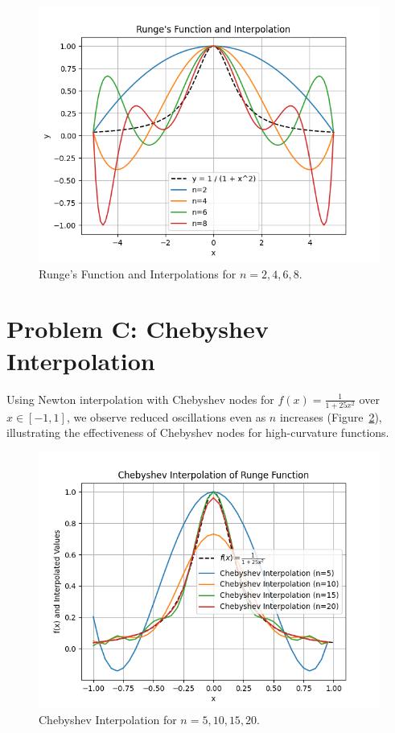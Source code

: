 \documentclass[a4paper]{article}
\begin{document}
\begin{figure}[H]
    \centering
    \includegraphics[scale=0.5]{B.png}
    \caption{Runge's Function and Interpolations for \( n = 2, 4, 6, 8 \).}
    \label{fig:runge}
\end{figure}

\section*{Problem C: Chebyshev Interpolation}
Using Newton interpolation with Chebyshev nodes for \( f(x) = \frac{1}{1 + 25x^2} \) over \( x \in [-1, 1] \), we observe reduced oscillations even as \( n \) increases (Figure~\ref{fig:chebyshev}), illustrating the effectiveness of Chebyshev nodes for high-curvature functions.

\begin{figure}[H]
    \centering
    \includegraphics[scale=0.5]{C.png}
    \caption{Chebyshev Interpolation for \( n = 5, 10, 15, 20 \).}
    \label{fig:chebyshev}
\end{figure}
\end{document}
